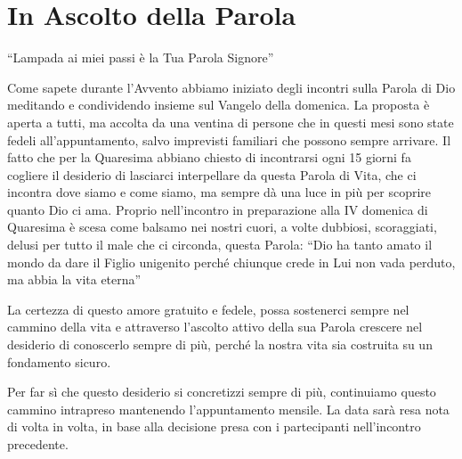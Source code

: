 \section{In Ascolto della Parola}
“Lampada ai miei passi è la Tua Parola Signore”

Come sapete durante l’Avvento abbiamo iniziato degli incontri sulla Parola di Dio meditando e condividendo insieme sul Vangelo della domenica. La proposta è aperta a tutti, ma accolta da una ventina di persone che in questi mesi sono state fedeli all’appuntamento, salvo imprevisti familiari che possono sempre arrivare. Il fatto che per la Quaresima abbiano chiesto di incontrarsi ogni 15 giorni fa cogliere il desiderio di lasciarci interpellare da questa Parola di Vita, che ci incontra dove siamo e come siamo, ma sempre dà una luce in più per scoprire quanto Dio ci ama. Proprio nell’incontro in preparazione alla IV domenica di Quaresima è scesa come balsamo nei nostri cuori, a volte dubbiosi, scoraggiati, delusi per tutto il male che ci circonda, questa Parola: “Dio ha tanto amato il mondo da dare il Figlio unigenito perché chiunque crede in Lui non vada perduto, ma abbia la vita eterna”

La certezza di questo amore gratuito e fedele, possa sostenerci sempre nel cammino della vita e attraverso l’ascolto attivo della sua Parola crescere nel desiderio di conoscerlo sempre di più, perché la nostra vita sia costruita su un fondamento sicuro.

Per far sì che questo desiderio si concretizzi sempre di più, continuiamo questo cammino intrapreso mantenendo l’appuntamento mensile. La data sarà resa nota di volta in volta, in base alla decisione presa con i partecipanti nell’incontro precedente.

